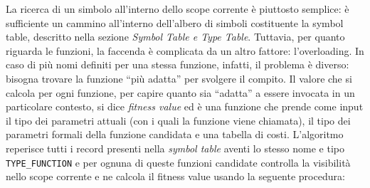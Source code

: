 \documentclass[a4paper, 11pt]{article}
\newcommand{\code}[1]{\scriptsize{\texttt{#1}}\normalsize}
\begin{document}
La ricerca di un simbolo all'interno dello scope corrente \`e piuttosto semplice: \`e sufficiente un cammino all'interno dell'albero di simboli costituente la symbol table, descritto nella sezione \emph{Symbol Table e Type Table}.
Tuttavia, per quanto riguarda le funzioni, la faccenda \`e complicata da un altro fattore: l'overloading.
In caso di pi\`u nomi definiti per una stessa funzione, infatti, il problema \`e diverso: bisogna trovare la funzione ``pi\`u adatta'' per svolgere il compito. Il valore che si calcola per ogni funzione, per capire quanto sia ``adatta'' a essere invocata in un particolare contesto, si dice \emph{fitness value} ed \`e una funzione che prende come input il tipo dei parametri attuali (con i quali la funzione viene chiamata), il tipo dei parametri formali della funzione candidata e una tabella di costi.
L'algoritmo reperisce tutti i record presenti nella \emph{symbol table} aventi lo stesso nome e tipo \code{TYPE\_FUNCTION} e per ognuna di queste funzioni candidate controlla la visibilit\`a nello scope corrente e ne calcola il fitness value usando la seguente procedura:
\end{document}
